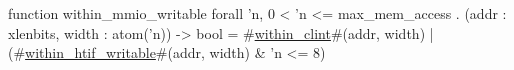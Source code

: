 function within_mmio_writable forall 'n, 0 < 'n <= max_mem_access . (addr : xlenbits, width : atom('n)) -> bool =
  #\hyperref[sailRISCVzwithinzyclint]{within\_clint}#(addr, width) | (#\hyperref[sailRISCVzwithinzyhtifzywritable]{within\_htif\_writable}#(addr, width) & 'n <= 8)
